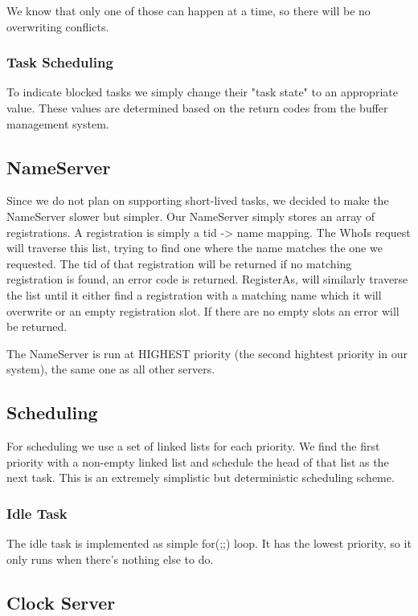 \documentclass{article}
\begin{document}
We know that only one of those can happen at a time, so there will be no overwriting conflicts.

\subsubsection{Task Scheduling}

To indicate blocked tasks we simply change their "task state" to an appropriate value. These values are determined based on the return codes from the buffer management system.

\subsection{NameServer}

Since we do not plan on supporting short-lived tasks, we decided to make the NameServer slower but simpler. Our NameServer simply stores an array of registrations. A registration is simply a tid -> name mapping. The WhoIs request will traverse this list, trying to find one where the name matches the one we requested. The tid of that registration will be returned if no matching registration is found, an error code is returned. RegisterAs, will similarly traverse the list until it either find a registration with a matching name which it will overwrite or an empty registration slot. If there are no empty slots an error will be returned.

The NameServer is run at HIGHEST priority (the second hightest priority in our system), the same one as all other servers. 

\subsection{Scheduling}

For scheduling we use a set of linked lists for each priority. We find the first priority with a non-empty linked list and schedule the head of that list as the next task. This is an extremely simplistic but deterministic scheduling scheme.

\subsubsection{Idle Task}

The idle task is implemented as simple for(;;) loop. It has the lowest priority, so it only runs when there's nothing else to do.

\subsection{Clock Server}
\end{document}
